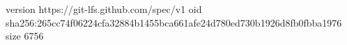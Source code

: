 version https://git-lfs.github.com/spec/v1
oid sha256:265cc74f06224cfa32884b1455bca661afe24d780ed730b1926d8fb0fbba1976
size 6756
